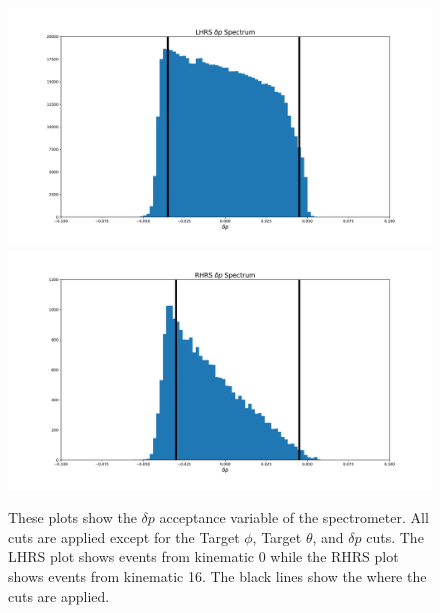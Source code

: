 \begin{figure}
\begin{center}
	\includegraphics[width=\textwidth]{./analysis/fig/LHRS_dp.pdf}
	\includegraphics[width=\textwidth]{./analysis/fig/RHRS_dp.pdf}
	\caption{These plots show the $\delta p$ acceptance variable of the spectrometer. All cuts are applied except for the Target $\phi$, Target $\theta$, and $\delta p$ cuts. The LHRS plot shows events from kinematic 0 while the RHRS plot shows events from kinematic 16. The black lines show the where the cuts are applied.}
	\label{fig:dp}
\end{center}
\end{figure}

